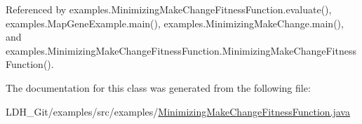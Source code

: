 Referenced by examples.\-Minimizing\-Make\-Change\-Fitness\-Function.\-evaluate(), examples.\-Map\-Gene\-Example.\-main(), examples.\-Minimizing\-Make\-Change.\-main(), and examples.\-Minimizing\-Make\-Change\-Fitness\-Function.\-Minimizing\-Make\-Change\-Fitness\-Function().



The documentation for this class was generated from the following file\-:\begin{DoxyCompactItemize}
\item 
L\-D\-H\-\_\-\-Git/examples/src/examples/\hyperlink{_minimizing_make_change_fitness_function_8java}{Minimizing\-Make\-Change\-Fitness\-Function.\-java}\end{DoxyCompactItemize}
